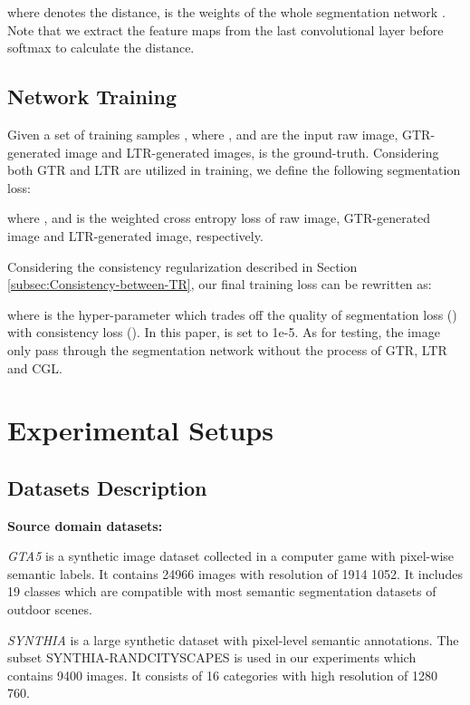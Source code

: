 \documentclass[twocolumn,journal,vlined,ruled,linesnumbered]{IEEEtran}
\begin{document}
\vspace{-2mm}


where  denotes the  distance,  is the weights of the whole segmentation network  . Note that we extract the feature maps from the last convolutional layer before softmax to calculate the  distance.

\subsection{Network Training}

Given a set of training samples , where ,  and  are the input raw image, GTR-generated image and LTR-generated images,  is the ground-truth. Considering both GTR and LTR are utilized in training, we define the following segmentation loss:

\vspace{-2mm}


where ,  and  is the weighted cross entropy loss of raw image, GTR-generated image and LTR-generated image, respectively.

Considering the consistency regularization described in Section \ref{subsec:Consistency-between-TR}, our final training loss can be rewritten as:


where  is the hyper-parameter which trades off the quality of segmentation loss () with consistency loss (). In this paper,  is set to 1e-5. As for testing, the image only pass through the segmentation network without the process of GTR, LTR and CGL.

\section{Experimental Setups\label{sec:Experimental-Setups}}

\subsection{Datasets Description}

\noindent \textbf{Source domain datasets:}

\textit{GTA5} is a synthetic image dataset collected in a computer game with pixel-wise semantic labels. It contains 24966 images with resolution of 1914  1052. It includes 19 classes which are compatible with most semantic segmentation datasets of outdoor scenes.

\textit{SYNTHIA} is a large synthetic dataset with pixel-level semantic annotations. The subset SYNTHIA-RANDCITYSCAPES is used in our experiments which contains 9400 images. It consists of 16 categories with high resolution of 1280  760.
\end{document}
